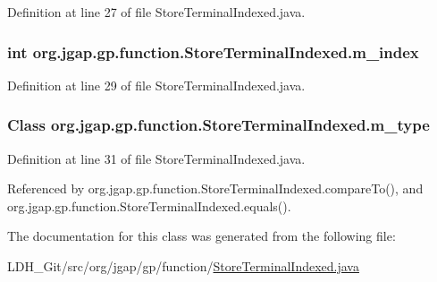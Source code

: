 Definition at line 27 of file Store\-Terminal\-Indexed.\-java.

\hypertarget{classorg_1_1jgap_1_1gp_1_1function_1_1_store_terminal_indexed_adf35898830f412d30643af3a4bd5d5b0}{
\subsubsection[{m\-\_\-index}]{\setlength{\rightskip}{0pt plus 5cm}int org.\-jgap.\-gp.\-function.\-Store\-Terminal\-Indexed.\-m\-\_\-index\hspace{0.3cm}{\ttfamily [private]}}}\label{classorg_1_1jgap_1_1gp_1_1function_1_1_store_terminal_indexed_adf35898830f412d30643af3a4bd5d5b0}


Definition at line 29 of file Store\-Terminal\-Indexed.\-java.

\hypertarget{classorg_1_1jgap_1_1gp_1_1function_1_1_store_terminal_indexed_a3f956f933adda02689aead6ccbc2e0d3}{
\subsubsection[{m\-\_\-type}]{\setlength{\rightskip}{0pt plus 5cm}Class org.\-jgap.\-gp.\-function.\-Store\-Terminal\-Indexed.\-m\-\_\-type\hspace{0.3cm}{\ttfamily [private]}}}\label{classorg_1_1jgap_1_1gp_1_1function_1_1_store_terminal_indexed_a3f956f933adda02689aead6ccbc2e0d3}


Definition at line 31 of file Store\-Terminal\-Indexed.\-java.



Referenced by org.\-jgap.\-gp.\-function.\-Store\-Terminal\-Indexed.\-compare\-To(), and org.\-jgap.\-gp.\-function.\-Store\-Terminal\-Indexed.\-equals().



The documentation for this class was generated from the following file\-:\begin{DoxyCompactItemize}
\item 
L\-D\-H\-\_\-\-Git/src/org/jgap/gp/function/\hyperlink{_store_terminal_indexed_8java}{Store\-Terminal\-Indexed.\-java}\end{DoxyCompactItemize}
